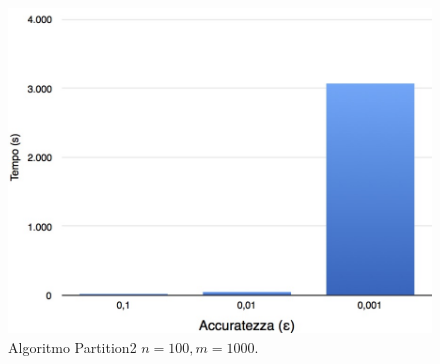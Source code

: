\begin{figure}[!htb]
	\vspace*{1cm}
	\centering
	\includegraphics[scale=.3]{img/eps/100.jpg}
	\caption{Algoritmo Partition2 $n = 100, m = 1000$.}
\end{figure}
\clearpage
